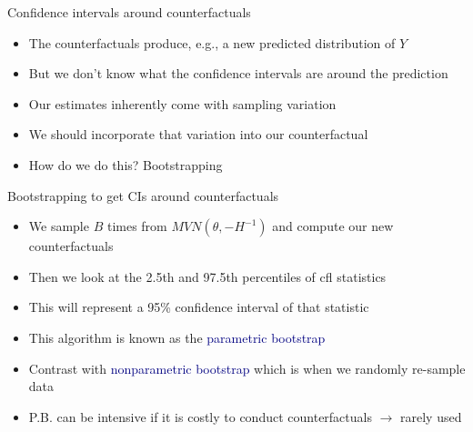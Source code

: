 \documentclass[aspectratio=169]{beamer}
\begin{document}
\begin{frame}

Confidence intervals around counterfactuals

\bigskip{}

\begin{itemize}
\itemsep1.5em
\item<2-> The counterfactuals produce, e.g., a new predicted distribution of $Y$
\item<3-> But we don't know what the confidence intervals are around the prediction
\item<4-> Our estimates inherently come with sampling variation
\item<5-> We should incorporate that variation into our counterfactual
\item<6-> How do we do this? Bootstrapping
\end{itemize}

\end{frame}

\begin{frame}

Bootstrapping to get CIs around counterfactuals

\bigskip{}


\bigskip{}



\end{frame}

\begin{frame}

\begin{itemize}
\itemsep1.5em
\item<1-> We sample $B$ times from $MVN(\theta,-H^{-1})$ and compute our new counterfactuals
\item<2-> Then we look at the 2.5th and 97.5th percentiles of cfl statistics
\item<3-> This will represent a 95\% confidence interval of that statistic
\item<4-> This algorithm is known as the \textcolor{navy}{parametric bootstrap}
\item<5-> Contrast with \textcolor{navy}{nonparametric bootstrap} which is when we randomly re-sample data
\item<6-> P.B. can be intensive if it is costly to conduct counterfactuals $\to$ rarely used
\end{itemize}

\end{frame}
\end{document}
